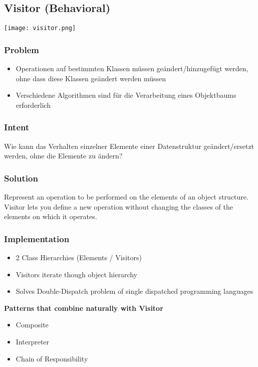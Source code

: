\subsection{Visitor (Behavioral)}

\texttt{[image: visitor.png]}

\subsubsection{Problem}
\begin{itemize}
    \item Operationen auf bestimmten Klassen müssen geändert/hinzugefügt werden, ohne dass diese Klassen geändert werden müssen
    \item Verschiedene Algorithmen sind für die Verarbeitung eines Objektbaums erforderlich
\end{itemize}

\subsubsection{Intent}
Wie kann das Verhalten einzelner Elemente einer Datenstruktur geändert/ersetzt werden, ohne die Elemente zu ändern?

\subsubsection{Solution}
Represent an operation to be performed on the elements of an object structure. Visitor lets you define a new operation without changing the classes of the elements on which it operates.

\subsubsection{Implementation}
\begin{itemize}
    \item 2 Class Hierarchies (Elements / Visitors)
    \item Visitors iterate though object hierarchy
    \item Solves Double-Dispatch problem of single dispatched programming languages
\end{itemize}
\vspace{10pt}
\textbf{Patterns that combine naturally with Visitor}
\begin{itemize}
    \item Composite
    \item Interpreter
    \item Chain of Responsibility
\end{itemize}

